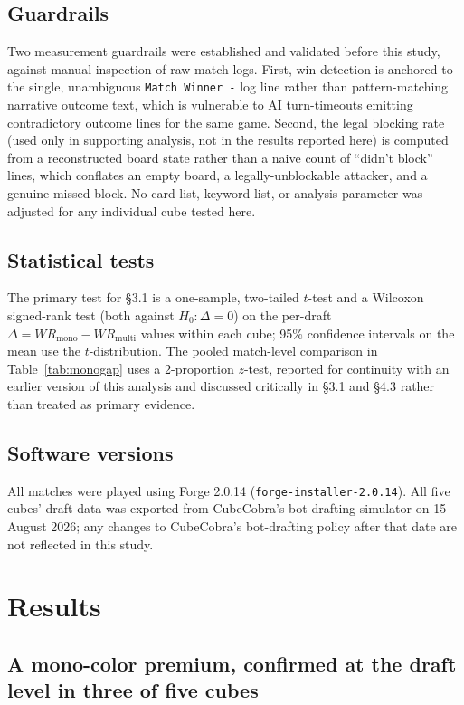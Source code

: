 \documentclass[11pt]{article}
\begin{document}
\subsection{Guardrails}

Two measurement guardrails were established and validated before this study,
against manual inspection of raw match logs. First, win detection is anchored to
the single, unambiguous \texttt{Match Winner -} log line rather than
pattern-matching narrative outcome text, which is vulnerable to AI turn-timeouts
emitting contradictory outcome lines for the same game. Second, the legal
blocking rate (used only in supporting analysis, not in the results reported
here) is computed from a reconstructed board state rather than a naive count of
``didn't block'' lines, which conflates an empty board, a legally-unblockable
attacker, and a genuine missed block. No card list, keyword list, or analysis
parameter was adjusted for any individual cube tested here.

\subsection{Statistical tests}

The primary test for \S3.1 is a one-sample, two-tailed $t$-test and a Wilcoxon
signed-rank test (both against $H_0: \Delta=0$) on the per-draft
$\Delta = WR_{\text{mono}} - WR_{\text{multi}}$ values within each cube; 95\%
confidence intervals on the mean use the $t$-distribution. The pooled
match-level comparison in Table~\ref{tab:monogap} uses a 2-proportion
$z$-test, reported for continuity with an earlier version of this analysis and
discussed critically in \S3.1 and \S4.3 rather than treated as primary evidence.

\subsection{Software versions}

All matches were played using Forge 2.0.14 (\texttt{forge-installer-2.0.14}).
All five cubes' draft data was exported from CubeCobra's bot-drafting simulator
on 15 August 2026; any changes to CubeCobra's bot-drafting policy after that date
are not reflected in this study.

\section{Results}

\subsection{A mono-color premium, confirmed at the draft level in three of five cubes}
\end{document}
